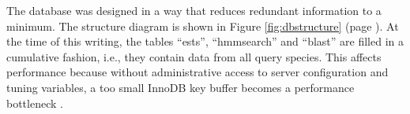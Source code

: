 The database was designed in a way that reduces redundant information to a
minimum. The structure diagram is shown in Figure \ref{fig:dbstructure} (page
\pageref{fig:dbstructure}). At the time of this writing, the tables ``ests'',
``hmmsearch'' and ``blast'' are filled in a cumulative fashion, i.e., they
contain data from all query species. This affects performance because without
administrative access to server configuration and tuning variables, a too small
InnoDB key buffer becomes a performance bottleneck \citep{mysql2013}.

%


